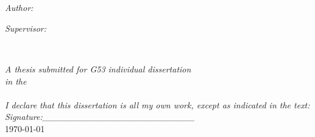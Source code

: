 \documentclass[
11pt, %
english, %
singlespacing, %
headsepline, %
]{MastersDoctoralThesis} %
\author{Jiahe \textsc{Chen}\\psyjc3@nottingham.ac.uk\\4255607} %
\begin{document}
\frontmatter %
\pagestyle{plain} %

\begin{titlepage}
\begin{center}

\vspace*{.06\textheight}
{\scshape\LARGE \univname\par}\vspace{1.5cm} %

\HRule \\[0.4cm] %
{\huge \bfseries \ttitle\par}\vspace{0.4cm} %
\HRule \\[1.5cm] %
 
\begin{minipage}[t]{0.4\textwidth}
\begin{flushleft} \large
\emph{Author:}\\
\href{http://hanslen.me}{\authorname} %
\end{flushleft}
\end{minipage}
\begin{minipage}[t]{0.4\textwidth}
\begin{flushright} \large
\emph{Supervisor:} \\
\href{http://www.nottingham.ac.uk}{\supname} %
\end{flushright}
\end{minipage}\\[3cm]
 
\vfill

\large \textit{A thesis submitted for G53 individual dissertation}\\[0.3cm] %
\textit{in the}\\[0.4cm]
\deptname\\[2cm] %
 
\vfill
\large \textit{I declare that this dissertation is all my own work, except as indicated in the text:}\\[0.3cm]
\large \textit{Signature:\_\_\_\_\_\_\_\_\_\_\_\_\_\_\_\_\_\_\_\_\_\_\_\_}\\[0.3cm]
{\large \today}\\[4cm] %
 
\vfill
\end{center}
\end{titlepage}
\end{document}
